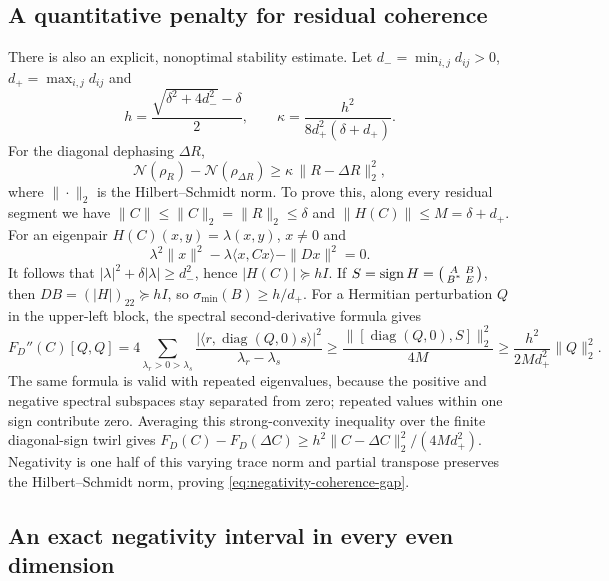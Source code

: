 \subsection{A quantitative penalty for residual coherence}

There is also an explicit, nonoptimal stability estimate. Let
$d_- =\min_{i,j}d_{ij}>0$, $d_+=\max_{i,j}d_{ij}$ and
\[
 h=\frac{\sqrt{\delta^2+4d_-^2}-\delta}{2},\qquad
 \kappa=\frac{h^2}{8d_+^2(\delta+d_+)}.
\]
For the diagonal dephasing $\Delta R$,
\begin{equation}\label{eq:negativity-coherence-gap}
 \mathcal N(\rho_R)-\mathcal N(\rho_{\Delta R})
       \ge \kappa\,\|R-\Delta R\|_2^2,
\end{equation}
where $\|\cdot\|_2$ is the Hilbert--Schmidt norm.
To prove this, along every residual segment we have
$\|C\|\le\|C\|_2=\|R\|_2\le\delta$ and
$\|H(C)\|\le M=\delta+d_+$.
For an eigenpair $H(C)(x,y)=\lambda(x,y)$, $x\ne0$ and
\[
 \lambda^2\|x\|^2-\lambda\langle x,Cx\rangle-\|Dx\|^2=0.
\]
It follows that $|\lambda|^2+\delta|\lambda|\ge d_-^2$, hence
$|H(C)|\succeq hI$. If
$S=\operatorname{sign}H=\begin{psmallmatrix}A&B\\B^*&E\end{psmallmatrix}$,
then $DB=(|H|)_{22}\succeq hI$, so
$\sigma_{\min}(B)\ge h/d_+$.
For a Hermitian perturbation $Q$ in the upper-left block, the spectral
second-derivative formula gives
\[
 F_D''(C)[Q,Q]
 =4\sum_{\lambda_r>0>\lambda_s}
      \frac{|\langle r,\operatorname{diag}(Q,0)s\rangle|^2}
           {\lambda_r-\lambda_s}
 \ge\frac{\|[\operatorname{diag}(Q,0),S]\|_2^2}{4M}
 \ge\frac{h^2}{2Md_+^2}\|Q\|_2^2.
\]
The same formula is valid with repeated eigenvalues, because the positive
and negative spectral subspaces stay separated from zero; repeated values
within one sign contribute zero. Averaging this strong-convexity inequality
over the finite diagonal-sign twirl gives
$F_D(C)-F_D(\Delta C)\ge h^2\|C-\Delta C\|_2^2/(4Md_+^2)$.
Negativity is one half of this varying trace norm and partial transpose
preserves the Hilbert--Schmidt norm, proving
\eqref{eq:negativity-coherence-gap}.

\subsection{An exact negativity interval in every even dimension}

